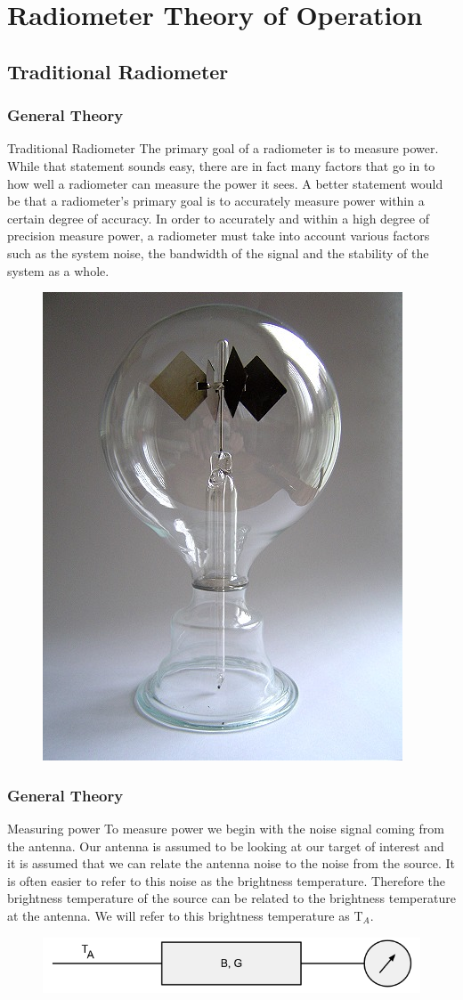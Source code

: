 \documentclass[notes]{beamer}
\begin{document}
\section{Radiometer Theory of Operation}
\subsection{Traditional Radiometer}
\begin{frame}
\frametitle{General Theory}
\begin{block}{Traditional Radiometer}
The primary goal of a radiometer is to measure power.  While that statement sounds easy, there are in fact many factors that go in to how well a radiometer can measure the power it sees.  A better statement would be that a radiometer's primary goal is to accurately measure power within a certain degree of accuracy.  In order to accurately and within a high degree of precision measure power, a radiometer must take into account various factors such as the system noise, the bandwidth of the signal and the stability of the system as a whole. 
\end{block}

\begin{figure}\label{crookes}
\includegraphics[width=0.15\linewidth]{images/Crookes_radiometer.jpg}
\end{figure}
\end{frame}

\begin{frame}
\frametitle{General Theory}
\begin{block}{Measuring power}
To measure power we begin with the noise signal coming from the antenna.  Our antenna is assumed to be looking at our target of interest and it is assumed that we can relate the antenna noise to the noise from the source.  It is often easier to refer to this noise as the brightness temperature.  Therefore the brightness temperature of the source can be related to the brightness temperature at the antenna.  We will refer to this brightness temperature as T$_{A}$\cite{Ulaby}.  

{\begin{figure}[h!tb] 
\centering
\includegraphics[width=\textwidth]{../Images/simple_rad.png}
\label{simplerad}
\end{figure}
}
\end{block}
\end{frame}
\end{document}
